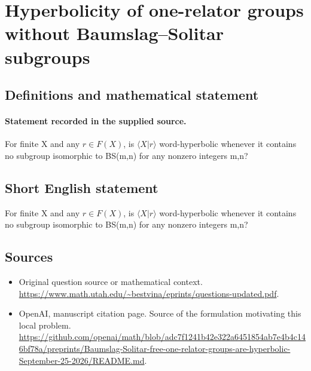 \documentclass[11pt]{article}
\begin{document}
\section*{Hyperbolicity of one-relator groups without Baumslag–Solitar subgroups}\label{statement}
\subsection{Definitions and mathematical statement}
\paragraph{Statement recorded in the supplied source.}
For finite X and any $r\in F(X)$, is $\langle X|r\rangle $ word-hyperbolic whenever it contains no subgroup isomorphic to BS(m,n) for any nonzero integers m,n?
\subsection{Short English statement}
For finite X and any $r\in F(X)$, is $\langle X|r\rangle $ word-hyperbolic whenever it contains no subgroup isomorphic to BS(m,n) for any nonzero integers m,n?
\subsection{Sources}
\begin{itemize}
\item[S1] Original question source or mathematical context.
\url{https://www.math.utah.edu/~bestvina/eprints/questions-updated.pdf}.
\item[S2] OpenAI, manuscript citation page. Source of the formulation motivating this local problem.
\url{https://github.com/openai/math/blob/adc7f1241b42e322a6451854ab7e4b4c146bf78a/preprints/Baumslag-Solitar-free-one-relator-groups-are-hyperbolic-September-25-2026/README.md}.
\end{itemize}
\end{document}
